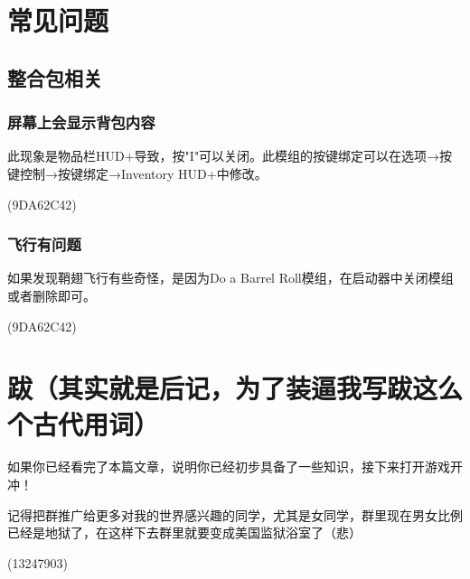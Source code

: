 \documentclass[UTF8,a4paper]{article}
\begin{document}
	\section{常见问题}
		\subsection{整合包相关}
			\subsubsection{屏幕上会显示背包内容}
				\par 此现象是物品栏HUD+导致，按"I"可以关闭。此模组的按键绑定可以在选项→按键控制→按键绑定→Inventory HUD+中修改。
				\begin{flushright}(9DA62C42)\end{flushright}
			\subsubsection{飞行有问题}
				\par 如果发现鞘翅飞行有些奇怪，是因为Do a Barrel Roll模组，在启动器中关闭模组或者删除即可。
				\begin{flushright}(9DA62C42)\end{flushright}
    
	\section{跋（其实就是后记，为了装逼我写跋这么个古代用词）}
		\par 如果你已经看完了本篇文章，说明你已经初步具备了一些知识，接下来打开游戏开冲！
		\par 记得把群推广给更多对我的世界感兴趣的同学，尤其是女同学，群里现在男女比例已经是地狱了，在这样下去群里就要变成美国监狱浴室了（悲）
		\begin{flushright}(13247903)\end{flushright}
\end{document}
